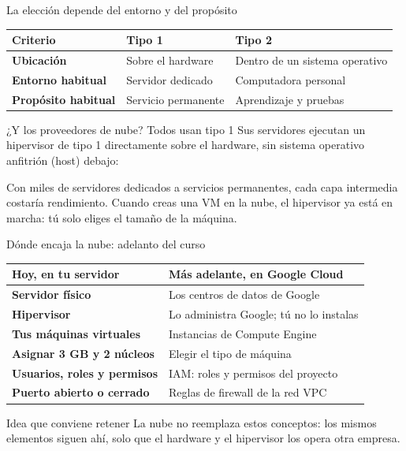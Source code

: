 \documentclass[aspectratio=169,10pt,c]{beamer}
\begin{document}
\begin{frame}{La elección depende del entorno y del propósito}
\begin{center}
\small
\begin{tabular}{>{\bfseries}p{3.0cm}p{3.4cm}p{5.0cm}}
\toprule
Criterio & Tipo 1 & Tipo 2 \\
\midrule
Ubicación & Sobre el hardware & Dentro de un sistema operativo \\
Entorno habitual & Servidor dedicado & Computadora personal \\
Propósito habitual & Servicio permanente & Aprendizaje y pruebas \\
\bottomrule
\end{tabular}
\end{center}
\vspace{0.25cm}
\begin{block}{¿Y los proveedores de nube? Todos usan tipo 1}
\small Sus servidores ejecutan un hipervisor de tipo 1 directamente sobre el hardware, sin sistema operativo anfitrión (host) debajo:
\begin{center}
  
\end{center}
\vspace{-0.15cm}
Con miles de servidores dedicados a servicios permanentes, cada capa intermedia costaría rendimiento. Cuando creas una VM en la nube, el hipervisor ya está en marcha: tú solo eliges el tamaño de la máquina.
\end{block}
\end{frame}

\begin{frame}{Dónde encaja la nube: adelanto del curso\apoyo}
\begin{center}
\small
\begin{tabular}{>{\bfseries}p{4.2cm}p{6.4cm}}
\toprule
Hoy, en tu servidor & Más adelante, en Google Cloud \\
\midrule
Servidor físico & Los centros de datos de Google \\
Hipervisor & Lo administra Google; tú no lo instalas \\
Tus máquinas virtuales & Instancias de Compute Engine \\
Asignar 3 GB y 2 núcleos & Elegir el tipo de máquina \\
Usuarios, roles y permisos & IAM: roles y permisos del proyecto \\
Puerto abierto o cerrado & Reglas de firewall de la red VPC \\
\bottomrule
\end{tabular}
\end{center}
\vspace{0.15cm}
\begin{block}{Idea que conviene retener}
\small La nube no reemplaza estos conceptos: los mismos elementos siguen ahí, solo que el hardware y el hipervisor los opera otra empresa.
\end{block}
\end{frame}
\end{document}
